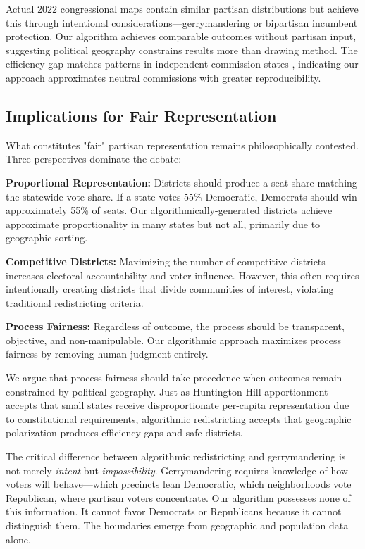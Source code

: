 Actual 2022 congressional maps contain similar partisan distributions but achieve this through intentional considerations—gerrymandering or bipartisan incumbent protection. Our algorithm achieves comparable outcomes without partisan input, suggesting political geography constrains results more than drawing method. The efficiency gap matches patterns in independent commission states \cite{chen2013unintentional}, indicating our approach approximates neutral commissions with greater reproducibility.
\subsection{Implications for Fair Representation}

What constitutes "fair" partisan representation remains philosophically contested. Three perspectives dominate the debate:

\textbf{Proportional Representation:} Districts should produce a seat share matching the statewide vote share. If a state votes 55\% Democratic, Democrats should win approximately 55\% of seats. Our algorithmically-generated districts achieve approximate proportionality in many states but not all, primarily due to geographic sorting.

\textbf{Competitive Districts:} Maximizing the number of competitive districts increases electoral accountability and voter influence. However, this often requires intentionally creating districts that divide communities of interest, violating traditional redistricting criteria.

\textbf{Process Fairness:} Regardless of outcome, the process should be transparent, objective, and non-manipulable. Our algorithmic approach maximizes process fairness by removing human judgment entirely.

We argue that process fairness should take precedence when outcomes remain constrained by political geography. Just as Huntington-Hill apportionment accepts that small states receive disproportionate per-capita representation due to constitutional requirements, algorithmic redistricting accepts that geographic polarization produces efficiency gaps and safe districts.

The critical difference between algorithmic redistricting and gerrymandering is not merely \textit{intent} but \textit{impossibility}. Gerrymandering requires knowledge of how voters will behave—which precincts lean Democratic, which neighborhoods vote Republican, where partisan voters concentrate. Our algorithm possesses none of this information. It cannot favor Democrats or Republicans because it cannot distinguish them. The boundaries emerge from geographic and population data alone.

